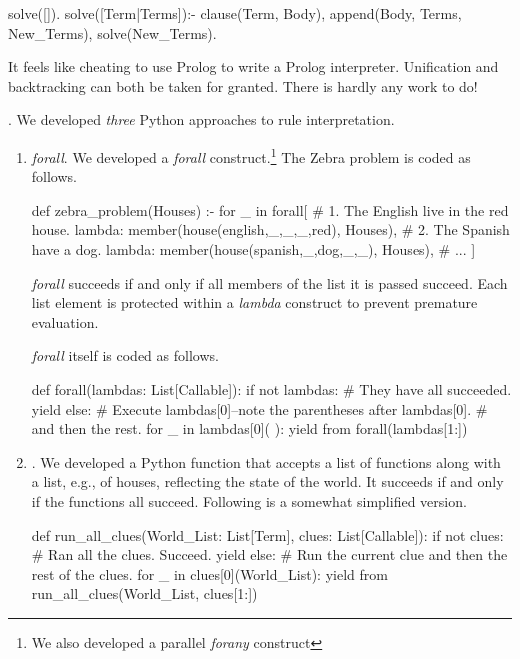 \begin{minipage}{\linewidth}
\begin{python}
solve([]).
solve([Term|Terms]):-
  clause(Term, Body),
  append(Body, Terms, New_Terms),
  solve(New_Terms).
\end{python}
\end{minipage}

It feels like cheating to use Prolog to write a Prolog interpreter. Unification and backtracking can both be taken for granted. There is hardly any work to do! 
\smallv

. We developed \textit{three} Python approaches to rule interpretation. 
\begin{enumerate}

\item \textit{forall}. We developed a \textit{forall} construct.\footnote{We also developed a parallel \textit{forany} construct} The Zebra problem is coded as follows.

\begin{python}
def zebra_problem(Houses) :-
    for _ in forall{[
        # 1. The English live in the red house.
        lambda: member(house(english,_,_,_,red), Houses),
        # 2. The Spanish have a dog.
        lambda: member(house(spanish,_,dog,_,_), Houses),
        # ...
        ]}
\end{python}

 \textit{forall} succeeds if and only if all members of the list it is passed succeed. Each list element is protected within a \textit{lambda} construct to prevent premature evaluation.
 \smallv
 
 \textit{forall} itself is coded as follows.
 
\begin{python}
def forall(lambdas: List[Callable]):
  if not lambdas:
    # They have all succeeded.
    yield
  else:
    # Execute lambdas[0]--note the parentheses after lambdas[0].
    # and then the rest. 
    for _ in lambdas[0]( ):
      yield from forall(lambdas[1:])
 
 \end{python}

\item {}. We developed a Python function that accepts a list of functions along with a list, e.g., of houses, reflecting the state of the world. It succeeds if and only if the functions all succeed. Following is a somewhat simplified version.

\begin{python}
def run_all_clues(World_List: List[Term], clues: List[Callable]):
    if not clues:
      # Ran all the clues. Succeed.
      yield
    else:
      # Run the current clue and then the rest of the clues.
      for _ in clues[0](World_List):
        yield from run_all_clues(World_List, clues[1:])
\end{python}


\end{enumerate}
